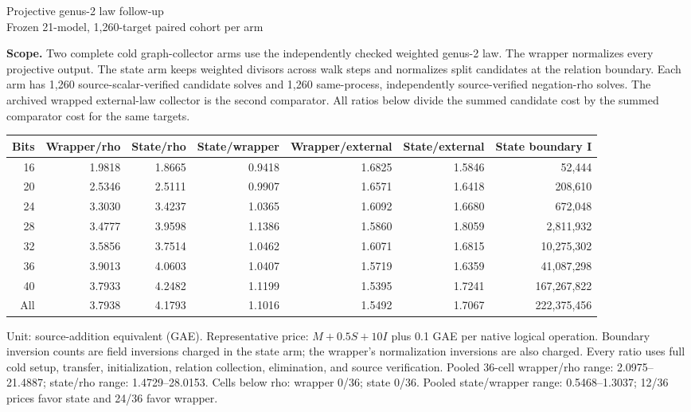 \documentclass[10pt]{article}
\begin{document}
\begin{center}\Large Projective genus-2 law follow-up\\[3pt]\normalsize Frozen 21-model, 1,260-target paired cohort per arm\end{center}
\noindent\textbf{Scope.} Two complete cold graph-collector arms use the independently checked weighted genus-2 law. The wrapper normalizes every projective output. The state arm keeps weighted divisors across walk steps and normalizes split candidates at the relation boundary. Each arm has 1,260 source-scalar-verified candidate solves and 1,260 same-process, independently source-verified negation-rho solves. The archived wrapped external-law collector is the second comparator. All ratios below divide the summed candidate cost by the summed comparator cost for the same targets.
\medskip
\begin{center}\small\begin{tabular}{r|r r r|r r|r}
Bits & Wrapper/rho & State/rho & State/wrapper & Wrapper/external & State/external & State boundary I \\
\hline
16 & 1.9818 & 1.8665 & 0.9418 & 1.6825 & 1.5846 & 52,444 \\
20 & 2.5346 & 2.5111 & 0.9907 & 1.6571 & 1.6418 & 208,610 \\
24 & 3.3030 & 3.4237 & 1.0365 & 1.6092 & 1.6680 & 672,048 \\
28 & 3.4777 & 3.9598 & 1.1386 & 1.5860 & 1.8059 & 2,811,932 \\
32 & 3.5856 & 3.7514 & 1.0462 & 1.6071 & 1.6815 & 10,275,302 \\
36 & 3.9013 & 4.0603 & 1.0407 & 1.5719 & 1.6359 & 41,087,298 \\
40 & 3.7933 & 4.2482 & 1.1199 & 1.5395 & 1.7241 & 167,267,822 \\
\hline
All & 3.7938 & 4.1793 & 1.1016 & 1.5492 & 1.7067 & 222,375,456 \\
\end{tabular}\end{center}
\noindent Unit: source-addition equivalent (GAE). Representative price: $M+0.5S+10I$ plus 0.1 GAE per native logical operation. Boundary inversion counts are field inversions charged in the state arm; the wrapper's normalization inversions are also charged. Every ratio uses full cold setup, transfer, initialization, relation collection, elimination, and source verification.
\medskip
\noindent Pooled 36-cell wrapper/rho range: 2.0975--21.4887; state/rho range: 1.4729--28.0153. Cells below rho: wrapper 0/36; state 0/36. Pooled state/wrapper range: 0.5468--1.3037; 12/36 prices favor state and 24/36 favor wrapper.
\end{document}
